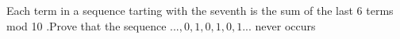 Each term in a sequence tarting with the seventh is the sum of the last 6 terms mod 10 .Prove that the sequence $...,0,1,0,1,0,1...$ never occurs